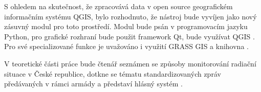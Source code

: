 S ohledem na skutečnost, že  zpracovává data v open source geografickém informačním systému QGIS, bylo rozhodnuto, že nástroj bude vyvíjen jako nový zásuvný modul pro toto prostředí. Modul bude psán v programovacím jazyku Python, pro grafické rozhraní bude použit framework Qt, bude využívat QGIS . Pro své specializované funkce je uvažováno i využití GRASS GIS  a knihovna . 

V teoretické části práce bude čtenář seznámen se způsoby monitorování radiační situace v České republice, dotkne se tématu standardizovaných zpráv předávaných v rámci armády a představí hlásný systém .
     
